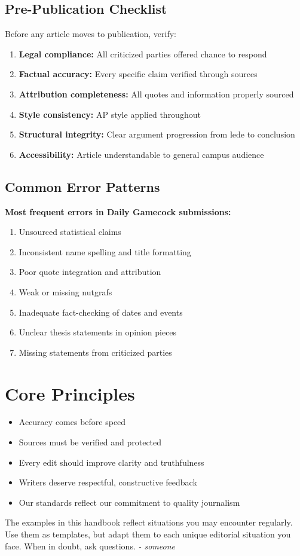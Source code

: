 \documentclass[12pt]{article}
\begin{document}
\subsection{Pre-Publication Checklist}

Before any article moves to publication, verify:

\begin{enumerate}[leftmargin=*]
    \item \textbf{Legal compliance:} All criticized parties offered chance to respond
    \item \textbf{Factual accuracy:} Every specific claim verified through sources
    \item \textbf{Attribution completeness:} All quotes and information properly sourced
    \item \textbf{Style consistency:} AP style applied throughout
    \item \textbf{Structural integrity:} Clear argument progression from lede to conclusion
    \item \textbf{Accessibility:} Article understandable to general campus audience
\end{enumerate}

\subsection{Common Error Patterns}

\textbf{Most frequent errors in Daily Gamecock submissions:}
\begin{enumerate}
    \item Unsourced statistical claims
    \item Inconsistent name spelling and title formatting
    \item Poor quote integration and attribution
    \item Weak or missing nutgrafs
    \item Inadequate fact-checking of dates and events
    \item Unclear thesis statements in opinion pieces
    \item Missing statements from criticized parties
\end{enumerate}

\newpage

\section{Core Principles}
\begin{itemize}
    \item Accuracy comes before speed
    \item Sources must be verified and protected
    \item Every edit should improve clarity and truthfulness
    \item Writers deserve respectful, constructive feedback
    \item Our standards reflect our commitment to quality journalism
\end{itemize}

\noindent The examples in this handbook reflect situations you may encounter regularly. Use them as templates, but adapt them to each unique editorial situation you face.
\newline\newline\newline
When in doubt, ask questions. \textit{- someone}
\end{document}
